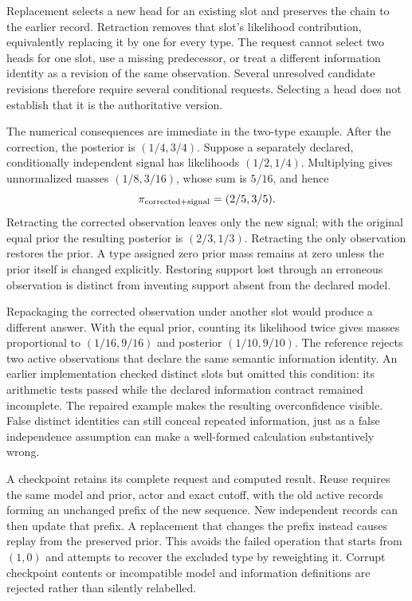 Replacement selects a new head for an existing slot and preserves the chain
to the earlier record. Retraction removes that slot's likelihood contribution,
equivalently replacing it by one for every type. The request cannot select two
heads for one slot, use a missing predecessor, or treat a different information
identity as a revision of the same observation. Several unresolved candidate
revisions therefore require several conditional requests. Selecting a head
does not establish that it is the authoritative version.

The numerical consequences are immediate in the two-type example. After the
correction, the posterior is $(1/4,3/4)$. Suppose a separately declared,
conditionally independent signal has likelihoods $(1/2,1/4)$. Multiplying
gives unnormalized masses $(1/8,3/16)$, whose sum is $5/16$, and hence
\begin{equation}
 \pi_{\rm corrected+signal}=(2/5,3/5).
\end{equation}
Retracting the corrected observation leaves only the new signal; with the
original equal prior the resulting posterior is $(2/3,1/3)$. Retracting the
only observation restores the prior. A type assigned zero prior mass remains
at zero unless the prior itself is changed explicitly. Restoring support lost
through an erroneous observation is distinct from inventing support absent
from the declared model.

Repackaging the corrected observation under another slot would produce a
different answer. With the equal prior, counting its likelihood twice gives
masses proportional to $(1/16,9/16)$ and posterior $(1/10,9/10)$. The reference
rejects two active observations that declare the same semantic information
identity. An earlier implementation checked distinct slots but omitted this
condition: its arithmetic tests passed while the declared information
contract remained incomplete. The repaired example makes the resulting
overconfidence visible. False distinct identities can still conceal repeated
information, just as a false independence assumption can make a well-formed
calculation substantively wrong.

A checkpoint retains its complete request and computed result. Reuse requires
the same model and prior, actor and exact cutoff, with the old active records
forming an unchanged prefix of the new sequence. New independent records can
then update that prefix. A replacement that changes the prefix instead causes
replay from the preserved prior. This avoids the failed operation that starts
from $(1,0)$ and attempts to recover the excluded type by reweighting it.
Corrupt checkpoint contents or incompatible model and information definitions
are rejected rather than silently relabelled.

